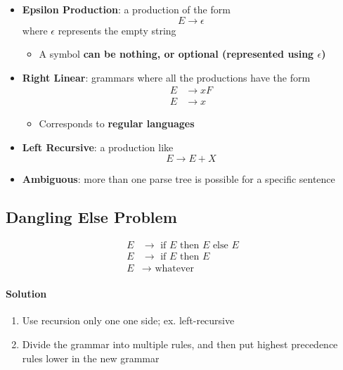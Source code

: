   \begin{itemize}
    \item \textbf{Epsilon Production}: a production of the form
    \begin{equation*}
      E \to \epsilon
    \end{equation*}
    where $ \epsilon $ represents the empty string

    \begin{itemize}
      \item A symbol \textbf{can be nothing, or optional (represented using
      $ \epsilon $)}
    \end{itemize}

    \item \textbf{Right Linear}: grammars where all the productions have the
    form
    \begin{align}
      E &\to x F \\
      E &\to x
    \end{align}

    \begin{itemize}
      \item Corresponds to \textbf{regular languages}
    \end{itemize}

    \item \textbf{Left Recursive}: a production like
    \begin{equation*}
      E \to E + X
    \end{equation*}

    \item \textbf{Ambiguous}: more than one parse tree is possible for a
    specific sentence
  \end{itemize}

  \subsection{Dangling Else Problem}

    \begin{align*}
      E &\to \text{ if } E \text{ then } E \text{ else } E \\
      E &\to \text{ if } E \text{ then } E \\
      E &\to \text{ whatever}
    \end{align*}

    \paragraph{Solution}
    \begin{enumerate}
      \item Use recursion only one one side; ex. left-recursive
      \item Divide the grammar into multiple rules, and then put highest
      precedence rules lower in the new grammar
    \end{enumerate}

